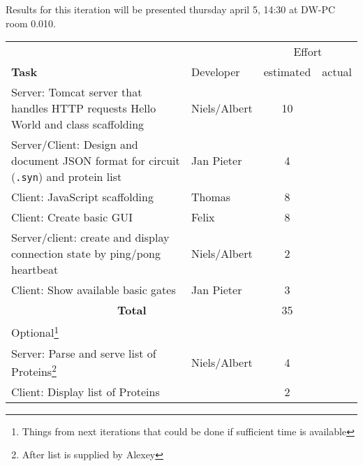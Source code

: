 \documentclass[a4paper]{article}
\begin{document}
Results for this iteration will be presented thursday april 5, 14:30 at DW-PC room 0.010.
\vfill
\setlength{\extrarowheight}{3pt}
\centering\begin{tabularx}{\textwidth}{p{10cm} | l | cc}
\multicolumn{2}{c}{}& \multicolumn{2}{c}{Effort} \\	
\textbf{Task} & Developer & estimated & actual \\
\hline
Server: Tomcat server that handles HTTP requests {\sc Hello World} and class scaffolding &
Niels/Albert & 10 & \\

Server/Client: Design and document JSON format for circuit (\verb|.syn|) and protein list &
Jan Pieter & 4 & \\

Client: JavaScript scaffolding &
Thomas & 8 & \\
 
Client: Create basic GUI &
Felix & 8 & \\
 
Server/client: create and display connection state by ping/pong heartbeat &
Niels/Albert & 2 & \\
 
Client: Show available basic gates &
Jan Pieter & 3 & \\ \hline

\multicolumn{2}{c}{\textbf{Total}  }
 & 35 & \\[8mm]
 
\multicolumn{2}{l}{Optional\footnote{Things from next iterations that could be done if sufficient time is available}} \\ \hline
Server: Parse and serve list of Proteins\footnote{After list is supplied by Alexey} &
Niels/Albert & 4 & \\
Client: Display list of Proteins &
 & 2 & \\
\hline 
\end{tabularx}

\end{document}
